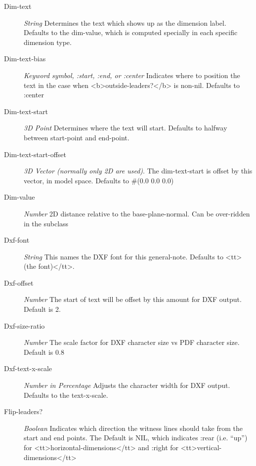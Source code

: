 \documentclass [11pt]{book}
\begin{document}
\begin{itemize}
\begin{description}
\item [Dim-text]
\emph{String} Determines the text which shows up as the dimension label. Defaults to the dim-value,
which is computed specially in each specific dimension type.


\item [Dim-text-bias]
\emph{Keyword symbol, :start, :end, or :center} Indicates where to position the text in the case when
<b>outside-leaders?</b> is non-nil. Defaults to :center


\item [Dim-text-start]
\emph{3D Point} Determines where the text will start. Defaults to halfway between start-point
and end-point.


\item [Dim-text-start-offset]
\emph{3D Vector (normally only 2D are used)}.
The dim-text-start is offset by this vector, in model space. Defaults to \#(0.0 0.0 0.0)


\item [Dim-value]
\emph{Number} 2D distance relative to the base-plane-normal. Can be over-ridden in the subclass


\item [Dxf-font]
\emph{String} This names the DXF font for this general-note. Defaults to <tt>(the font)</tt>.


\item [Dxf-offset]
\emph{Number} The start of text will be offset by this amount for DXF output. Default is 2.


\item [Dxf-size-ratio]
\emph{Number} The scale factor for DXF character size vs PDF character size. Default is 0.8


\item [Dxf-text-x-scale]
\emph{Number in Percentage} Adjusts the character width for DXF output. Defaults to the text-x-scale.


\item [Flip-leaders?]
\emph{Boolean} Indicates which direction the witness lines should take from the start and end points. The Default is NIL,
which indicates :rear (i.e. ``up'') for <tt>horizontal-dimensions</tt> and :right for <tt>vertical-dimensions</tt>



\end{description}
\end{itemize}
\end{document}
